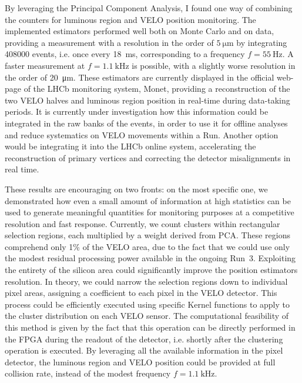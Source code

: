 By leveraging the Principal Component Analysis, I found one way of combining the counters for luminous region and VELO position monitoring. The implemented estimators performed well both on Monte Carlo and on data, providing a measurement with a resolution in the order of $\SI{5}{\micro\meter}$ by integrating 408000 events, i.e. once every \SI{18}{\milli\second}, corresponding to a frequency $f=\SI{55}{\hertz}$. A faster measurement at $f=\SI{1.1}{\kilo\hertz}$ is possible, with a slightly worse resolution in the order of \SI{20}{\micro\meter}.  These estimators are currently displayed in the official web-page of the LHCb monitoring system, Monet, providing a reconstruction of the two VELO halves and luminous region position in real-time during data-taking periods. It is currently under investigation how this information could be integrated in the raw banks of the events, in order to use it for offline analyses and reduce systematics on VELO movements within a Run. Another option would be integrating it into the LHCb online system, accelerating the reconstruction of primary vertices and correcting the detector misalignments in real time.

These results are encouraging on two fronts: on the most specific one, we demonstrated how even a small amount of information at high statistics can be used to generate meaningful quantities for monitoring purposes at a competitive resolution and fast response. Currently, we count clusters within rectangular selection regions, each multiplied by a weight derived from PCA. These regions comprehend only 1\% of the VELO area, due to the fact that we could use only the modest residual processing power available in the ongoing Run~3. Exploiting the entirety of the silicon area could significantly improve the position estimators resolution.  In theory, we could narrow the selection regions down to individual pixel areas, assigning a coefficient to each pixel in the VELO detector. This process could be efficiently executed using specific Kernel functions to apply to the cluster distribution on each VELO sensor. 
The computational feasibility of this method is given by the fact that this operation can be directly performed in the FPGA during the readout of the detector, i.e. shortly after the clustering operation is executed. By leveraging all the available information in the pixel detector, the luminous region and VELO position could be provided at full collision rate, instead of the modest frequency $f=\SI{1.1}{\kilo\hertz}$.

